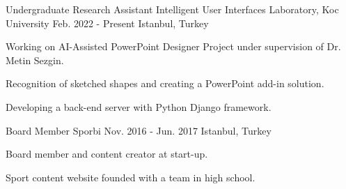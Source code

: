 
\begin{cventries}

  \cventry
    {Undergraduate Research Assistant}
    {Intelligent User Interfaces Laboratory, Koc University}
    {Feb. 2022 - Present}
    {Istanbul, Turkey}
    {
      \begin{cvitems}
        \item {Working on AI-Assisted PowerPoint Designer Project under supervision of Dr. Metin Sezgin.}
        \item {Recognition of sketched shapes and creating a PowerPoint add-in solution.}
        \item {Developing a back-end server with Python Django framework.}
      \end{cvitems}
    }

  \cventry
    {Board Member}
    {Sporbi}
    {Nov. 2016 - Jun. 2017}
    {Istanbul, Turkey}
    {
      \begin{cvitems}
        \item {Board member and content creator at start-up.}
        \item {Sport content website founded with a team in high school.}
      \end{cvitems}
    }

\end{cventries}
